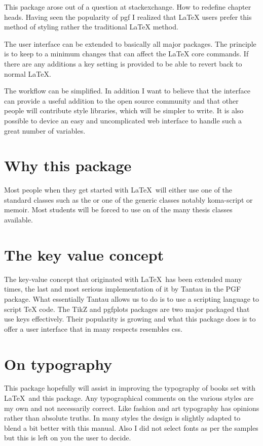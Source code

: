 This package arose out of a question at stackexchange. How to redefine chapter heads. Having seen the popularity of pgf I realized that LaTeX users prefer this method of styling rather the traditional LaTeX method.

The user interface can be extended to basically all major packages. The principle is to keep to a minimum changes that can affect the LaTeX core commands. If there are any additions a key setting is provided to be able to revert back to normal LaTeX.

The workflow can be simplified. In addition I want to believe that the interface can provide a useful addition to the open source community and that other people will contribute style libraries, which will be simpler to write. It is also possible
to device an easy and uncomplicated web interface to handle
such a great number of variables.

\section{Why this package}

Most people when they get started with \LaTeX\ will either use one of the standard classes such as the  or one of the generic classes notably koma-script or memoir. Most students will be forced to use on of the many thesis classes available.

\section{The key value concept}

The key-value concept that originated with \LaTeX\ has been extended many times, the last and most serious implementation of it by Tantau in the PGF package. What essentially Tantau allows us to do is to use a scripting language to script TeX code. The TikZ and pgfplots packages are two major packaged that use keys effectively. Their popularity is growing and what this package does is to offer a user interface that in many respects resembles css.


\section{On typography}

This package hopefully will assist in improving the typography of books set with \LaTeX\ and this package. Any typographical comments on the various styles are my own and not necessarily correct. Like fashion and art typography has opinions rather than absolute truths. In many styles the design is slightly adapted to blend a bit better with this manual. Also I did not select fonts as per the samples but this is left on you the user to decide.

